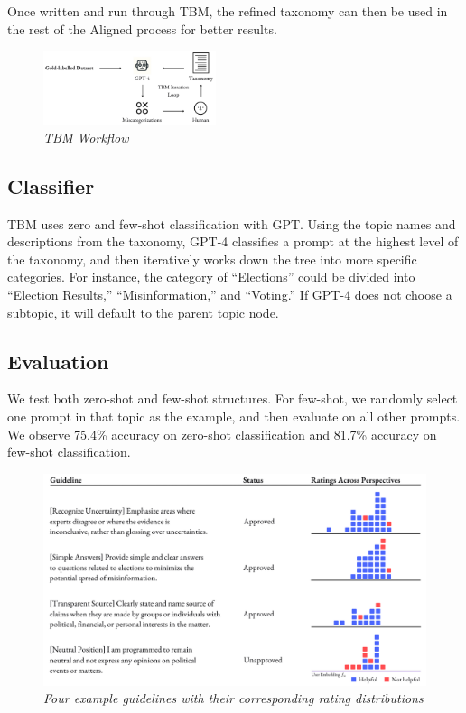 \documentclass{article}
\begin{document}
\begin{multicols}{2}
Once written and run through TBM, the refined taxonomy can then be used in the rest of the Aligned process for better results.

\begin{figure}[H]
    \centering
    \includegraphics[width=0.45\textwidth]{TBM.png}
    \caption{\textit{TBM Workflow}}
    \label{tbmworkflow}
\end{figure}
\vspace{-10pt}

\subsection{Classifier}

TBM uses zero and few-shot classification with GPT. Using the topic names and descriptions from the taxonomy, GPT-4 classifies a prompt at the highest level of the taxonomy, and then iteratively works down the tree into more specific categories. For instance, the category of “Elections” could be divided into “Election Results,” “Misinformation,” and “Voting.” If GPT-4 does not choose a subtopic, it will default to the parent topic node.

\subsection{Evaluation}

We test both zero-shot and few-shot structures. For few-shot, we randomly select one prompt in that topic as the example, and then evaluate on all other prompts. We observe 75.4\% accuracy on zero-shot classification and 81.7\% accuracy on few-shot classification. 

\begin{figure}[ht!]
    \centering
    \includegraphics[width=\textwidth]{ex.png}
    \caption{\textit{Four example guidelines with their corresponding rating distributions}}
    \label{glexs}
\end{figure}


\end{multicols}
\end{document}
